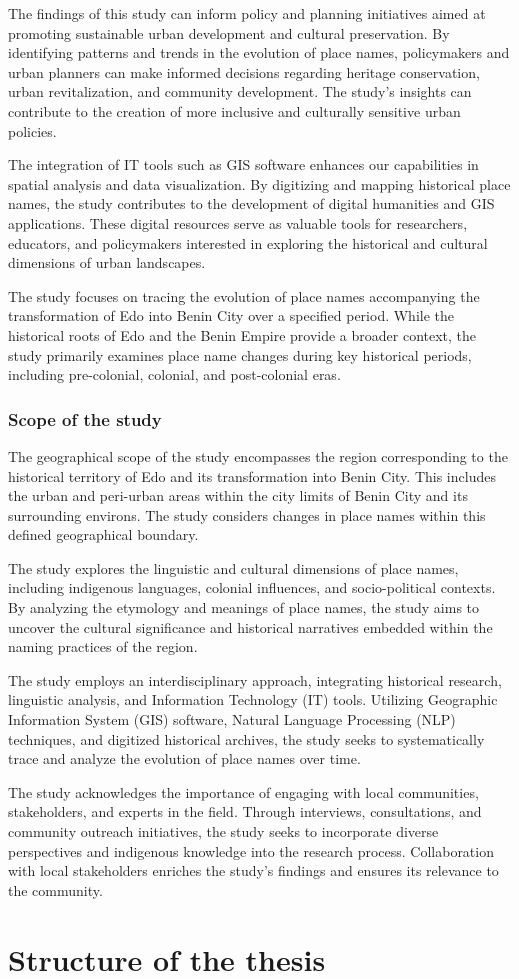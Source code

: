 The findings of this study can inform policy and planning initiatives aimed at promoting sustainable urban development and cultural preservation. By identifying patterns and trends in the evolution of place names, policymakers and urban planners can make informed decisions regarding heritage conservation, urban revitalization, and community development. The study's insights can contribute to the creation of more inclusive and culturally sensitive urban policies.


The integration of IT tools such as GIS software enhances our capabilities in spatial analysis and data visualization. By digitizing and mapping historical place names, the study contributes to the development of digital humanities and GIS applications. These digital resources serve as valuable tools for researchers, educators, and policymakers interested in exploring the historical and cultural dimensions of urban landscapes.


The study focuses on tracing the evolution of place names accompanying the transformation of Edo into Benin City over a specified period. While the historical roots of Edo and the Benin Empire provide a broader context, the study primarily examines place name changes during key historical periods, including pre-colonial, colonial, and post-colonial eras.
\subsubsection{Scope of the study}
The geographical scope of the study encompasses the region corresponding to the historical territory of Edo and its transformation into Benin City. This includes the urban and peri-urban areas within the city limits of Benin City and its surrounding environs. The study considers changes in place names within this defined geographical boundary.


The study explores the linguistic and cultural dimensions of place names, including indigenous languages, colonial influences, and socio-political contexts. By analyzing the etymology and meanings of place names, the study aims to uncover the cultural significance and historical narratives embedded within the naming practices of the region.


The study employs an interdisciplinary approach, integrating historical research, linguistic analysis, and Information Technology (IT) tools. Utilizing Geographic Information System (GIS) software, Natural Language Processing (NLP) techniques, and digitized historical archives, the study seeks to systematically trace and analyze the evolution of place names over time.


The study acknowledges the importance of engaging with local communities, stakeholders, and experts in the field. Through interviews, consultations, and community outreach initiatives, the study seeks to incorporate diverse perspectives and indigenous knowledge into the research process. Collaboration with local stakeholders enriches the study's findings and ensures its relevance to the community.

\section{Structure of the thesis}
